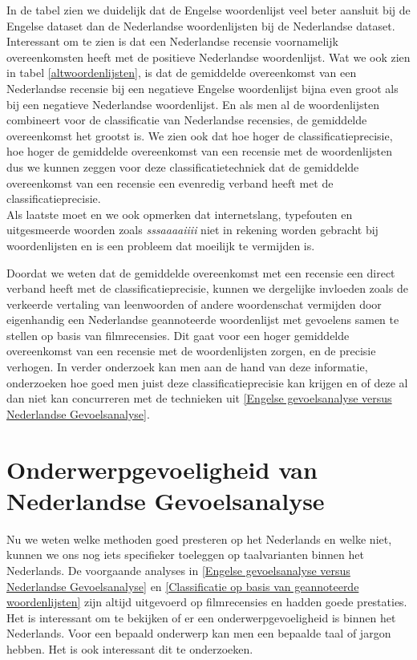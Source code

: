 In de tabel zien we duidelijk dat de Engelse woordenlijst veel beter aansluit bij de Engelse dataset dan de Nederlandse woordenlijsten bij de Nederlandse dataset. Interessant om te zien is dat een Nederlandse recensie voornamelijk overeenkomsten heeft met de positieve Nederlandse woordenlijst. Wat we ook zien in tabel \ref{altwoordenlijsten}, is dat de gemiddelde overeenkomst van een Nederlandse recensie bij een negatieve Engelse woordenlijst bijna even groot als bij een negatieve Nederlandse woordenlijst. En als men al de woordenlijsten combineert voor de classificatie van Nederlandse recensies, de gemiddelde overeenkomst het grootst is. We zien ook dat hoe hoger de classificatieprecisie, hoe hoger de gemiddelde overeenkomst van een recensie met de woordenlijsten dus we kunnen zeggen voor deze classificatietechniek dat de gemiddelde overeenkomst van een recensie een evenredig verband heeft met de classificatieprecisie.\\

Als laatste moet en we ook opmerken dat internetslang, typefouten en uitgesmeerde woorden zoals \textit{sssaaaaiiii} niet in rekening worden gebracht bij woordenlijsten en is een probleem dat moeilijk te vermijden is. 

Doordat we weten dat de gemiddelde overeenkomst met een recensie een direct verband heeft met de classificatieprecisie, kunnen we dergelijke invloeden zoals de verkeerde vertaling van leenwoorden of andere woordenschat vermijden door eigenhandig een Nederlandse geannoteerde woordenlijst met gevoelens samen te stellen op basis van filmrecensies. Dit gaat voor een hoger gemiddelde overeenkomst van een recensie met de woordenlijsten zorgen, en de precisie verhogen. In verder onderzoek kan men aan de hand van deze informatie, onderzoeken hoe goed men juist deze classificatieprecisie kan  krijgen en of deze al dan niet kan concurreren met de technieken uit \ref{Engelse gevoelsanalyse versus Nederlandse Gevoelsanalyse}.


\section{Onderwerpgevoeligheid van Nederlandse Gevoelsanalyse}\label{Onderwerpgevoeligheid van Nederlandse Gevoelsanalyse}

Nu we weten welke methoden goed presteren op het Nederlands en welke niet, kunnen we ons nog iets specifieker toeleggen op taalvarianten binnen het Nederlands. De voorgaande analyses in \ref{Engelse gevoelsanalyse versus Nederlandse Gevoelsanalyse} en \ref{Classificatie op basis van geannoteerde woordenlijsten} zijn altijd uitgevoerd op filmrecensies en hadden goede prestaties. Het is interessant om te bekijken of er een onderwerpgevoeligheid is binnen het Nederlands. Voor een bepaald onderwerp kan men een bepaalde taal of jargon hebben. Het is ook interessant dit te onderzoeken. \\

